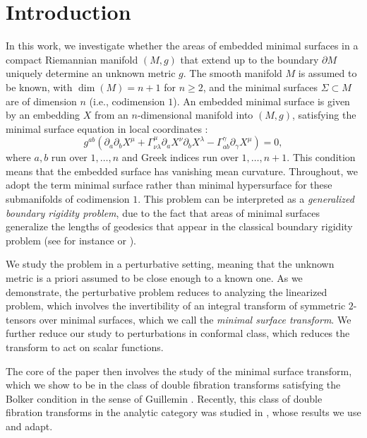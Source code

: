 \documentclass[11pt]{amsart}
\theoremstyle{definition}
\numberwithin{equation}{section}
\begin{document}
\maketitle

\section{Introduction}\label{sec_introduction}

In this work, we investigate whether the areas of embedded minimal surfaces in a compact Riemannian manifold $(M,g)$ that extend up to the boundary $\partial M$ uniquely determine an unknown metric $g$. The smooth manifold $M$ is assumed to be known, with $\dim(M) = n+1$ for $n \geq 2$, and the minimal surfaces $\Sigma \subset M$ are of dimension $n$ (i.e., codimension $1$). An embedded minimal surface is given by an embedding $X$ from an $n$-dimensional manifold into $(M,g)$, satisfying the minimal surface equation in local coordinates \cite{hubeny2007covariant}:
\begin{equation}\label{eq:embedded_min_surf}
g^{ab}\left(\partial_{a} \partial_{b} X^{\mu} + \Gamma^{\mu}_{\nu\lambda} \partial_{a} X^{\nu} \partial_{b} X^{\lambda} - \Gamma^{\gamma}_{ab} \partial_{\gamma} X^{\mu}\right) = 0,
\end{equation}
where $a,b$ run over $1, \dots, n$ and Greek indices run over $1, \dots, n+1$. This condition means that the embedded surface has vanishing mean curvature. Throughout, we adopt the term minimal surface rather than minimal hypersurface for these submanifolds of codimension $1$. This problem can be interpreted as a \emph{generalized boundary rigidity problem}, due to the fact that areas of minimal surfaces generalize the lengths of geodesics that appear in the classical boundary rigidity problem (see for instance \cite{zbMATH02201336, zbMATH07375200} or \cite[Chapter 11]{zbMATH07625517}).


We study the problem in a perturbative setting, meaning that the unknown metric is a priori assumed to be close enough to a known one. 
As we demonstrate, the perturbative problem reduces to analyzing the linearized problem, which involves the invertibility of an integral transform of symmetric $2$-tensors over minimal surfaces,  which we call the \emph{minimal surface transform}. We further reduce our study to perturbations in conformal class, which reduces the transform to act on scalar functions. 

The core of the paper then involves the study of the minimal surface transform, which we show to be in the class of double fibration transforms satisfying the Bolker condition in the sense of Guillemin \cite{MR812288}. Recently, this class of double fibration transforms in the analytic category was studied in \cite{MST}, whose results we use and adapt.
\end{document}
